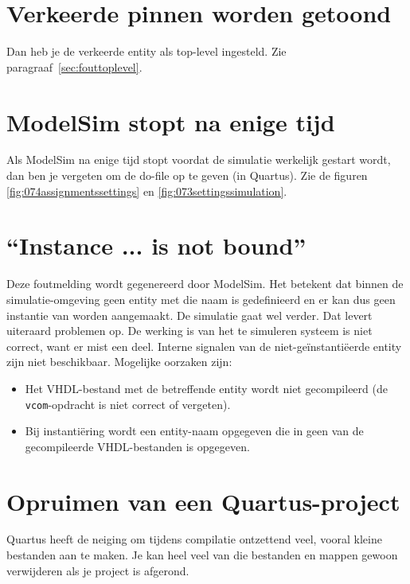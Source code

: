 \documentclass[a4paper,12pt,fleqn,twoside]{book}
\begin{document}
\section{Verkeerde pinnen worden getoond}
Dan heb je de verkeerde entity als top-level ingesteld. Zie
paragraaf~\ref{sec:fouttoplevel}.

\section{ModelSim stopt na enige tijd}
Als ModelSim na enige tijd stopt voordat de simulatie werkelijk gestart
wordt, dan ben je vergeten om de do-file op te geven (in Quartus). Zie de
figuren \ref{fig:074assignmentssettings} en \ref{fig:073settingssimulation}.

\section{``Instance ... is not bound''}
Deze foutmelding wordt gegenereerd door ModelSim. Het betekent dat binnen de
simulatie-omgeving geen entity met die naam is gedefinieerd en er kan dus geen
instantie van worden aangemaakt. De simulatie gaat wel verder. Dat levert
uiteraard problemen op. De werking is van het te simuleren systeem is niet
correct, want er mist een deel. Interne signalen van de
niet-ge\"instanti\"eerde entity zijn niet beschikbaar. Mogelijke oorzaken zijn:
\begin{itemize}
\item Het VHDL-bestand met de betreffende entity wordt niet gecompileerd
      (de \texttt{vcom}-opdracht is niet correct of vergeten).      
\item Bij instanti\"ering wordt een entity-naam opgegeven die in geen van
      de  gecompileerde VHDL-bestanden is opgegeven.
\end{itemize}

\section{Opruimen van een Quartus-project}
Quartus heeft de neiging om tijdens compilatie ontzettend veel, vooral kleine
bestanden aan te maken. Je kan heel veel van die bestanden en mappen gewoon
verwijderen als je project is afgerond.

\end{document}
